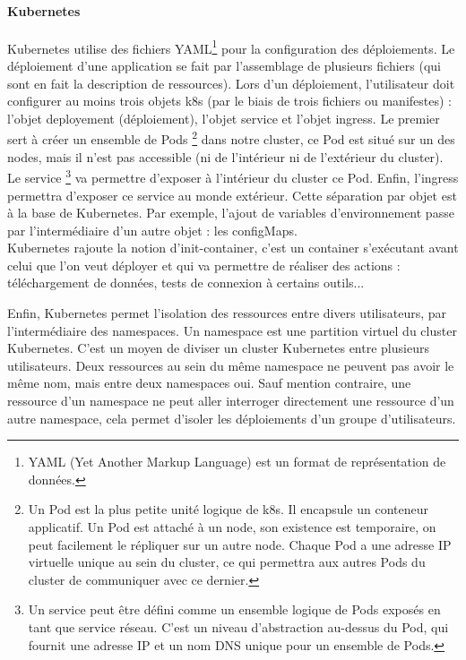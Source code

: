 \documentclass[11pt,fleqn]{book} %
\begin{document}
\paragraph{Kubernetes}
Kubernetes utilise des fichiers YAML\footnote{YAML (Yet Another Markup Language) est un format de représentation de données.} pour la configuration des déploiements. Le déploiement d'une application se fait par l'assemblage de plusieurs fichiers (qui sont en fait la description de ressources). Lors d'un déploiement, l'utilisateur doit configurer au moins trois objets k8s (par le biais de trois fichiers ou manifestes) : l'objet deployement (déploiement), l'objet service et l'objet ingress. Le premier sert à créer un ensemble de Pods \footnote{Un Pod est la plus petite unité logique de k8s. Il encapsule un conteneur applicatif. Un Pod est attaché à un node, son existence est temporaire, on peut facilement le répliquer sur un autre node. Chaque Pod a une adresse IP virtuelle unique au sein du cluster, ce qui permettra aux autres Pods du cluster de communiquer avec ce dernier.} dans notre cluster, ce Pod est situé sur un des nodes, mais il n'est pas accessible (ni de l'intérieur ni de l'extérieur du cluster). Le service \footnote{Un service peut être défini comme un ensemble logique de Pods exposés en tant que service réseau. C'est un niveau d'abstraction au-dessus du Pod, qui fournit une adresse IP et un nom DNS unique pour un ensemble de Pods.} va permettre d'exposer à l'intérieur du cluster ce Pod. Enfin, l'ingress permettra d'exposer ce service au monde extérieur. Cette séparation par objet est à la base de Kubernetes. Par exemple, l'ajout de variables d'environnement passe par l'intermédiaire d'un autre objet : les configMaps.\\

Kubernetes rajoute la notion d'init-container, c'est un container s'exécutant avant celui que l'on veut déployer et qui va permettre de réaliser des actions : téléchargement de données, tests de connexion à certains outils... \newline


Enfin, Kubernetes permet l'isolation des ressources entre divers utilisateurs, par l'intermédiaire des namespaces. Un namespace est une partition virtuel du cluster Kubernetes. C’est un moyen de diviser un cluster Kubernetes entre plusieurs utilisateurs. Deux ressources au sein du même namespace ne peuvent pas avoir le même nom, mais entre deux namespaces oui. Sauf mention contraire, une ressource d’un namespace ne peut aller interroger directement une ressource d’un autre namespace, cela permet d’isoler les déploiements d’un groupe d’utilisateurs.
\end{document}
